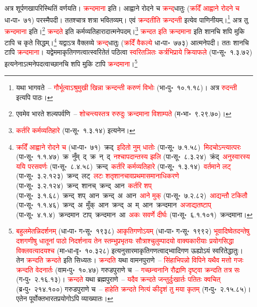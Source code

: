 \begin{sloppypar}\justifying\noindent\hspace{10mm} अत्र शूर्पणखा\-परिस्थितिं वर्णयति। \textcolor{red}{क्रन्दमाना} इति। आह्वाने रोदने च \textcolor{red}{क्रन्द्‌}\-धातुः (\textcolor{red}{क्रदिँ आह्वाने रोदने च} धा॰पा॰~७१) परस्मैपदी। ततश्चात्र शत्रा भवितव्यम्। एवं \textcolor{red}{क्रन्दतीति क्रन्दन्ती} इत्येव पाणिनीयम्।\footnote{यथा भागवते~– \textcolor{red}{गौर्भूत्वाऽश्रुमुखी खिन्ना क्रन्दन्ती करुणं विभोः} (भा॰पु॰~१०.१.१८)। अत्र \textcolor{red}{रुदन्ती} इत्यपि पाठः।} अत्र तु \textcolor{red}{क्रन्दमाना} इति।\footnote{एवमेव भारते शल्यपर्वणि~– \textcolor{red}{शोचन्त्यस्तत्र रुरुदुः क्रन्दमाना विशाम्पते} (म॰भा॰~९.२९.७०)।} 
\textcolor{red}{क्रन्दते} इति कर्म\-व्यतिहारादात्मनेपदम्।\footnote{\textcolor{red}{कर्तरि कर्म\-व्यतिहारे} (पा॰सू॰~१.३.१४) इत्यनेन।} \textcolor{red}{क्रन्दत इति क्रन्दमाना} इति शानचि शपि मुकि टापि च कृते सिद्धम्।\footnote{\textcolor{red}{क्रदिँ आह्वाने रोदने च} (धा॰पा॰~७१)~\arrow क्रद्~\arrow \textcolor{red}{इदितो नुम् धातोः} (पा॰सू॰~७.१.५८)~\arrow \textcolor{red}{मिदचोऽन्त्यात्परः} (पा॰सू॰~१.१.४७)~\arrow क्र~नुँम्~द्~\arrow क्र~न्~द्~\arrow \textcolor{red}{नश्चापदान्तस्य झलि} (पा॰सू॰~८.३.२४)~\arrow क्रंद्~\arrow \textcolor{red}{अनुस्वारस्य ययि परसवर्णः} (पा॰सू॰~८.४.५८)~\arrow क्रन्द्~\arrow \textcolor{red}{कर्तरि कर्म\-व्यतिहारे} (पा॰सू॰~१.३.१४)~\arrow \textcolor{red}{वर्तमाने लट्} (पा॰सू॰~३.२.१२३)~\arrow क्रन्द्~लट्~\arrow \textcolor{red}{लटः शतृशानचावप्रथमा\-समानाधिकरणे} (पा॰सू॰~३.२.१२४)~\arrow क्रन्द्~शानच्~\arrow क्रन्द्~आन~\arrow \textcolor{red}{कर्तरि शप्‌} (पा॰सू॰~३.१.६८)~\arrow क्रन्द्~शप्~आन~\arrow क्रन्द्~अ~आन~\arrow \textcolor{red}{आने मुक्} (पा॰सू॰~७.२.८२)~\arrow \textcolor{red}{आद्यन्तौ टकितौ} (पा॰सू॰~१.१.४६)~\arrow क्रन्द्~अ~मुँक्~आन~\arrow क्रन्द्~अ~म्~आन~\arrow क्रन्दमान~\arrow \textcolor{red}{अजाद्यतष्टाप्‌} (पा॰सू॰~४.१.४)~\arrow क्रन्दमान~टाप्~\arrow क्रन्दमान~आ~\arrow \textcolor{red}{अकः सवर्णे दीर्घः} (पा॰सू॰~६.१.१०१)~\arrow क्रन्दमाना।} यद्वाऽत्र वैक्लव्ये \textcolor{red}{क्रन्द्‌}\-धातुः (\textcolor{red}{क्रदिँ वैकल्ये} धा॰पा॰~७७३) आत्मनेपदी। ततः शानचि टापि \textcolor{red}{क्रन्दमाना}। यद्वेममाकृति\-गणत्वात्स्वरितेतं पठित्वा \textcolor{red}{स्वरितञितः कर्त्रभिप्राये क्रिया\-फले} (पा॰सू॰~१.३.७२) इत्यनेनाऽत्मनेपदत्वाच्छानचि शपि मुकि टापि \textcolor{red}{क्रन्दमाना}।\footnote{\textcolor{red}{बहुलमेतन्निदर्शनम्} (धा॰पा॰ ग॰सू॰~१९३८) \textcolor{red}{आकृतिगणोऽयम्} (धा॰पा॰ ग॰सू॰~१९९२) \textcolor{red}{भूवादिष्वेतदन्तेषु दशगणीषु धातूनां पाठो निदर्शनाय तेन स्तम्भुप्रभृतयः सौत्राश्चुलुम्पादयो वाक्यकारीयाः प्रयोगसिद्धा विक्लवत्यादयश्च} (मा॰धा॰वृ॰~१०.३२८) इत्यनुसारमाकृति\-गणत्वाद्भ्वादि\-गण ऊह्योऽयं स्वरितेद्धातुः। तेन \textcolor{red}{क्रन्दति} \textcolor{red}{क्रन्दते} इति सिध्यतः। \textcolor{red}{क्रन्दति} यथा वामनपुराणे~– \textcolor{red}{सिंहाभिपन्नो विपिने यथैव मत्तो गजः क्रन्दति वेदनार्तः} (वाम॰पु॰~१०.४७) गरुडपुराणे च~– \textcolor{red}{गच्छन्वनानि रौद्राणि दृष्ट्वा क्रन्दति तत्र सः} (ग॰पु॰~२.१६.१३)। \textcolor{red}{क्रन्दते} यथा ब्रह्मपुराणे~– \textcolor{red}{यदैव क्रन्दते जन्तुर्दुःखार्तः पतितः क्वचित्} (ब्र॰पु॰~२१४.१००) गरुडपुराणे च~– \textcolor{red}{हाहेति क्रन्दते नित्यं कीदृशं तु मया कृतम्} (ग॰पु॰~२.१५.८५)। एतेन पूर्वोक्त\-भारत\-प्रयोगोऽपि व्याख्यातः।}\end{sloppypar}
